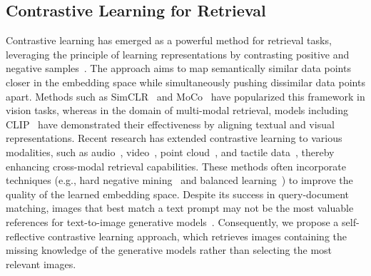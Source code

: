 \subsection{Contrastive Learning for Retrieval}
Contrastive learning has emerged as a powerful method for retrieval tasks, leveraging the principle of learning representations by contrasting positive and negative samples~\cite{khosla2020supervised,le2020contrastive}. The approach aims to map semantically similar data points closer in the embedding space while simultaneously pushing dissimilar data points apart. Methods such as SimCLR~\cite{chen2020simple} and MoCo~\cite{he2020momentum} have popularized this framework in vision tasks, whereas in the domain of multi-modal retrieval, models including CLIP~\cite{radford2021learning} have demonstrated their effectiveness by aligning textual and visual representations. Recent research has extended contrastive learning to various modalities, such as audio~\cite{radford2021learning,sun2023learning,likhosherstov2021polyvit,guzhov2022audioclip,mahmud2023ave,girdhar2023imagebind}, video~\cite{huang2023clover,fang2021clip2video,luo2022clip4clip,xue2022clip,zhu2023languagebind}, point cloud~\cite{zhang2022pointclip,zhu2022pointclip,huang2022clip2point,guo2023point}, and tactile data~\cite{yang2024binding, lei2024vit}, thereby enhancing cross-modal retrieval capabilities. These methods often incorporate techniques (e.g., hard negative mining~\cite{kalantidis2020hard,robinson2020contrastive} and balanced learning~\cite{zhu2022balanced,liu2022universal}) to improve the quality of the learned embedding space.
Despite its success in query-document matching, images that best match a text prompt may not be the most valuable references for text-to-image generative models~\cite{zhang2021cross}. Consequently, we propose a self-reflective contrastive learning approach, which retrieves images containing the missing knowledge of the generative models rather than selecting the most relevant images.